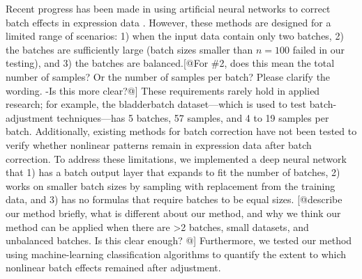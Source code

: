 \documentclass[11pt]{article}
\begin{document}
Recent progress has been made in using artificial neural networks to correct batch effects in expression data \cite{shaham_removal_2017,shaham_batch_2018,upadhyay_removal_2019}.
However, these methods are designed for a limited range of scenarios:
1) when the input data contain only two batches,
2) the batches are sufficiently large (batch sizes smaller than $n=100$ failed in our testing), and
3) the batches are balanced.[@For \#2, does this mean the total number of samples? Or the number of samples per batch? Please clarify the wording. -Is this more clear?@]
These requirements rarely hold in applied research; for example, the bladderbatch dataset---which is used to test batch-adjustment techniques\cite{leek_bladderbatch_2017,leek_sva_2017}---has 5 batches, 57 samples, and 4 to 19 samples per batch.
Additionally, existing methods for batch correction have not been tested to verify whether nonlinear patterns remain in expression data after batch correction.
To address these limitations, we implemented a deep neural network that 1) has a batch output layer that expands to fit
the number of batches, 2) works on smaller batch sizes by sampling with replacement from the training data, and 3) has
no formulas that require batches to be equal sizes. [@describe our method briefly, what is different about our method, and why we think our method can be applied when there are >2 batches, small datasets, and unbalanced batches. Is this clear enough? @]
Furthermore, we tested our method using machine-learning classification algorithms to quantify the extent to which nonlinear batch effects remained after adjustment.
\end{document}
